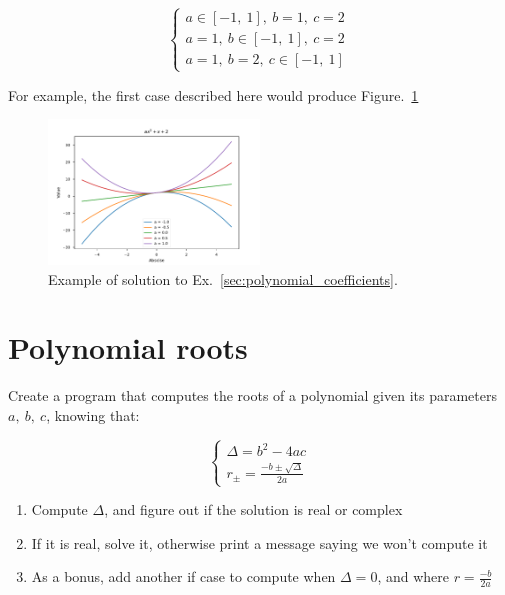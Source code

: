 \documentclass[twocolumn]{article}
\begin{document}
\begin{equation}\label{eq:system_polynomial}
    \begin{cases}
        a\in [-1,~1],~b=1,~c=2\\
        a=1,~b\in [-1,~1],~c=2\\
        a=1,~b=2,~c\in [-1,~1]
    \end{cases}\,
\end{equation}

For example, the first case described here would produce Figure.~\ref{fig:polynomial_example}

\begin{figure}
\centering
\includegraphics[width=0.5\textwidth]{figures/polynomial_a.pdf}
\caption{Example of solution to Ex.~\ref{sec:polynomial_coefficients}.}
\label{fig:polynomial_example}
\end{figure}

\section{Polynomial roots}\label{sec:polynomial_roots}

Create a program that computes the roots of a polynomial given its parameters $a,~b,~c$, knowing that:

\begin{equation}\label{eq:poly_roots}
    \begin{cases}
        \Delta = b^2 - 4ac\\
        r_\pm = \frac{-b \pm \sqrt{\Delta}}{2a}
    \end{cases}
\end{equation}

\begin{enumerate}
    \item Compute $\Delta$, and figure out if the solution is real or complex
    \item If it is real, solve it, otherwise print a message saying we won't compute it
    \item As a bonus, add another if case to compute when $\Delta=0$, and where $r=\frac{-b}{2a}$
\end{enumerate}
\end{document}
